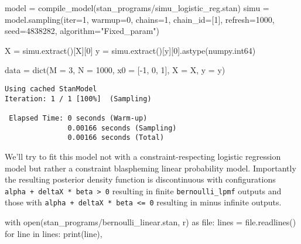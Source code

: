 \documentclass[
  letterpaper,
  DIV=11,
  numbers=noendperiod]{scrartcl}
\newenvironment{Shaded}{\begin{snugshade}}{\end{snugshade}}
\newcommand{\BuiltInTok}[1]{\textcolor[rgb]{0.00,0.23,0.31}{#1}}
\newcommand{\ControlFlowTok}[1]{\textcolor[rgb]{0.00,0.23,0.31}{#1}}
\newcommand{\DecValTok}[1]{\textcolor[rgb]{0.68,0.00,0.00}{#1}}
\newcommand{\ImportTok}[1]{\textcolor[rgb]{0.00,0.46,0.62}{#1}}
\newcommand{\KeywordTok}[1]{\textcolor[rgb]{0.00,0.23,0.31}{#1}}
\newcommand{\NormalTok}[1]{\textcolor[rgb]{0.00,0.23,0.31}{#1}}
\newcommand{\OperatorTok}[1]{\textcolor[rgb]{0.37,0.37,0.37}{#1}}
\newcommand{\StringTok}[1]{\textcolor[rgb]{0.13,0.47,0.30}{#1}}
\begin{document}
\begin{Shaded}
\begin{Highlighting}[]
\NormalTok{model }\OperatorTok{=}\NormalTok{ compile\_model(}\StringTok{\textquotesingle{}stan\_programs/simu\_logistic\_reg.stan\textquotesingle{}}\NormalTok{)}
\NormalTok{simu }\OperatorTok{=}\NormalTok{ model.sampling(}\BuiltInTok{iter}\OperatorTok{=}\DecValTok{1}\NormalTok{, warmup}\OperatorTok{=}\DecValTok{0}\NormalTok{, chains}\OperatorTok{=}\DecValTok{1}\NormalTok{, chain\_id}\OperatorTok{=}\NormalTok{[}\DecValTok{1}\NormalTok{],}
\NormalTok{                      refresh}\OperatorTok{=}\DecValTok{1000}\NormalTok{, seed}\OperatorTok{=}\DecValTok{4838282}\NormalTok{, algorithm}\OperatorTok{=}\StringTok{"Fixed\_param"}\NormalTok{)}

\NormalTok{X }\OperatorTok{=}\NormalTok{ simu.extract()[}\StringTok{\textquotesingle{}X\textquotesingle{}}\NormalTok{][}\DecValTok{0}\NormalTok{]}
\NormalTok{y }\OperatorTok{=}\NormalTok{ simu.extract()[}\StringTok{\textquotesingle{}y\textquotesingle{}}\NormalTok{][}\DecValTok{0}\NormalTok{].astype(numpy.int64)}

\NormalTok{data }\OperatorTok{=} \BuiltInTok{dict}\NormalTok{(M }\OperatorTok{=} \DecValTok{3}\NormalTok{, N }\OperatorTok{=} \DecValTok{1000}\NormalTok{, x0 }\OperatorTok{=}\NormalTok{ [}\OperatorTok{{-}}\DecValTok{1}\NormalTok{, }\DecValTok{0}\NormalTok{, }\DecValTok{1}\NormalTok{], X }\OperatorTok{=}\NormalTok{ X, y }\OperatorTok{=}\NormalTok{ y)}
\end{Highlighting}
\end{Shaded}

\begin{verbatim}
Using cached StanModel
Iteration: 1 / 1 [100%]  (Sampling)

 Elapsed Time: 0 seconds (Warm-up)
               0.00166 seconds (Sampling)
               0.00166 seconds (Total)
\end{verbatim}

We'll try to fit this model not with a constraint-respecting logistic
regression model but rather a constraint blaspheming linear probability
model. Importantly the resulting posterior density function is
discontinuous with configurations
\texttt{alpha\ +\ deltaX\ *\ beta\ \textgreater{}\ 0} resulting in
finite \texttt{bernoulli\_lpmf} outputs and those with
\texttt{alpha\ +\ deltaX\ *\ beta\ \textless{}=\ 0} resulting in minus
infinite outputs.

\begin{Shaded}
\begin{Highlighting}[]
\ControlFlowTok{with} \BuiltInTok{open}\NormalTok{(}\StringTok{\textquotesingle{}stan\_programs/bernoulli\_linear.stan\textquotesingle{}}\NormalTok{, }\StringTok{\textquotesingle{}r\textquotesingle{}}\NormalTok{) }\ImportTok{as} \BuiltInTok{file}\NormalTok{:}
\NormalTok{  lines }\OperatorTok{=} \BuiltInTok{file}\NormalTok{.readlines()}
  \ControlFlowTok{for}\NormalTok{ line }\KeywordTok{in}\NormalTok{ lines:}
    \BuiltInTok{print}\NormalTok{(line),}
\end{Highlighting}
\end{Shaded}
\end{document}
